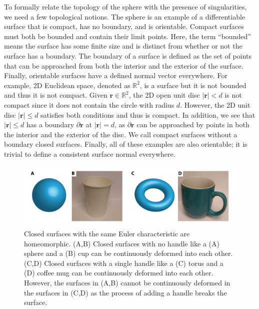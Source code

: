 To formally relate the topology of the sphere with the presence of singularities, we need a few topological notions.
The sphere is an example of a differentiable surface that is compact, has no boundary, and is orientable.
Compact surfaces must both be bounded and contain their limit points.
Here, the term ``bounded'' means the surface has some finite size and is distinct from whether or not the surface has a boundary.
The boundary of a surface is defined as the set of points that can be approached from both the interior and the exterior of the surface.
Finally, orientable surfaces have a defined normal vector everywhere.
For example, 2D Euclidean space, denoted as $\mathbb{R}^2$, is a surface but it is not bounded and thus it is not compact.
Given $\mathbf{r} \in \mathbb{R}^2$, the 2D open unit disc $|\mathbf{r}| < d$ is not compact since it does not contain the circle with radius $d$.
However, the 2D unit disc $|\mathbf{r}| \leq d$ satisfies both conditions and thus is compact.
In addition, we see that $|\mathbf{r}| \leq d$ has a boundary $\partial \mathbf{r}$ at $|\mathbf{r}| = d$, as $\partial \mathbf{r}$ can be approached by points in both the interior and the exterior of the disc.
We call compact surfaces without a boundary closed surfaces.
Finally, all of these examples are also orientable; it is trivial to define a consistent surface normal everywhere.
\begin{figure}
  \centering
  \includegraphics{figures/C1/Ch1-Figs_ChiObjects.png}
  \caption{Closed surfaces with the same Euler characteristic are homeomorphic. (A,B) Closed surfaces with no handle like a (A) sphere and a (B) cup can be continuously deformed into each other.
  (C,D) Closed surfaces with a single handle like a (C) torus and a (D) coffee mug can be continuously deformed into each other.
  However, the surfaces in (A,B) cannot be continuously deformed in the surfaces in (C,D) as the process of adding a handle breaks the surface.}\label{f:1-ChiObjects}
\end{figure}

